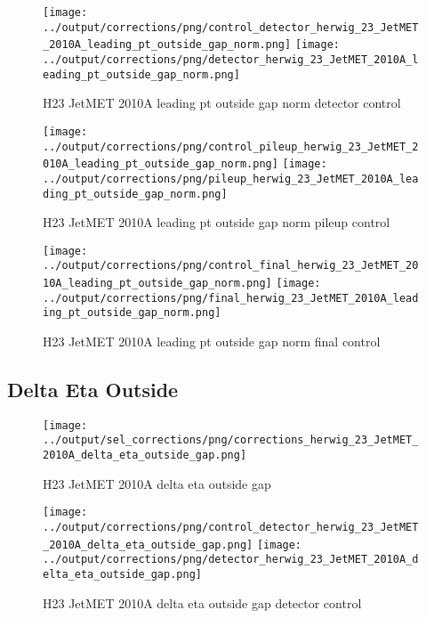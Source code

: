 \documentclass[11pt]{book}
\begin{document}
\begin{figure}[ht]
\centering
\texttt{[image: ../output/corrections/png/control\_detector\_herwig\_23\_JetMET\_2010A\_leading\_pt\_outside\_gap\_norm.png]}
\texttt{[image: ../output/corrections/png/detector\_herwig\_23\_JetMET\_2010A\_leading\_pt\_outside\_gap\_norm.png]}
\caption{H23 JetMET 2010A leading pt outside gap norm detector control}
\label{fig:H23_JetMET_2010A_leading_pt_outside_gap_norm_detector_control}
\end{figure}

\begin{figure}[ht]
\centering
\texttt{[image: ../output/corrections/png/control\_pileup\_herwig\_23\_JetMET\_2010A\_leading\_pt\_outside\_gap\_norm.png]}
\texttt{[image: ../output/corrections/png/pileup\_herwig\_23\_JetMET\_2010A\_leading\_pt\_outside\_gap\_norm.png]}
\caption{H23 JetMET 2010A leading pt outside gap norm pileup control}
\label{fig:H23_JetMET_2010A_leading_pt_outside_gap_norm_pileup_control}
\end{figure}


\begin{figure}[ht]
\centering
\texttt{[image: ../output/corrections/png/control\_final\_herwig\_23\_JetMET\_2010A\_leading\_pt\_outside\_gap\_norm.png]}
\texttt{[image: ../output/corrections/png/final\_herwig\_23\_JetMET\_2010A\_leading\_pt\_outside\_gap\_norm.png]}
\caption{H23 JetMET 2010A leading pt outside gap norm final control}
\label{fig:H23_JetMET_2010A_leading_pt_outside_gap_norm_final_control}
\end{figure}



\clearpage
\subsection{Delta Eta Outside}
\begin{figure}[ht]
\centering
\texttt{[image: ../output/sel\_corrections/png/corrections\_herwig\_23\_JetMET\_2010A\_delta\_eta\_outside\_gap.png]}
\caption{H23 JetMET 2010A delta eta outside gap}
\label{fig:H23_JetMET_2010A_delta_eta_outside_gap}
\end{figure}

\begin{figure}[ht]
\centering
\texttt{[image: ../output/corrections/png/control\_detector\_herwig\_23\_JetMET\_2010A\_delta\_eta\_outside\_gap.png]}
\texttt{[image: ../output/corrections/png/detector\_herwig\_23\_JetMET\_2010A\_delta\_eta\_outside\_gap.png]}
\caption{H23 JetMET 2010A delta eta outside gap detector control}
\label{fig:H23_JetMET_2010A_delta_eta_outside_gap_detector_control}
\end{figure}
\end{document}
